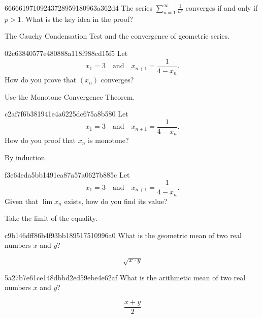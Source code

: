 \begin{note}{66666197109243728959180963a362d4}
    The series \({ \sum_{n=1}^{\infty} \frac{1}{n^{p}} }\) converges if and only if \({ p > 1 }\).
    What is the key idea in the proof?

    \begin{cloze}{1}
        The Cauchy Condensation Test and the convergence of geometric series.
    \end{cloze}
\end{note}

\begin{note}{02c63840577e480888a118f988cd15f5}
    Let
    \[
        x_1 = 3  \quad \text{and} \quad  x_{n+1} = \frac{1}{4 - x_n}.
    \]
    How do you prove that \({ (x_n) }\) converges?

    \begin{cloze}{1}
        Use the Monotone Convergence Theorem.
    \end{cloze}
\end{note}

\begin{note}{c2af7f6b381941e4a6225dc675a8b580}
    Let
    \[
        x_1 = 3  \quad \text{and} \quad  x_{n+1} = \frac{1}{4 - x_n}.
    \]
    How do you proof that \({ x_n }\) is monotone?

    \begin{cloze}{1}
        By induction.
    \end{cloze}
\end{note}

\begin{note}{f3e64eda5bb1491ea87a57a0627b885c}
    Let
    \[
        x_1 = 3  \quad \text{and} \quad  x_{n+1} = \frac{1}{4 - x_n}.
    \]
    Given that \({ \lim x_n }\) exists, how do you find its value?

    \begin{cloze}{1}
        Take the limit of the equality.
    \end{cloze}
\end{note}

\begin{note}{c9b146dff86b4f93bb189517510996a0}
    What is the geometric mean of two real numbers \({ x }\) and \({ y }\)?

    \begin{cloze}{1}
        \[
            \sqrt{x \cdot y}
        \]
    \end{cloze}
\end{note}

\begin{note}{5a27b7e61ce148dbbd2ed59ebe4e62af}
    What is the arithmetic mean of two real numbers \({ x }\) and \({ y }\)?

    \begin{cloze}{1}
        \[
            \frac{x + y}{2}
        \]
    \end{cloze}
\end{note}

